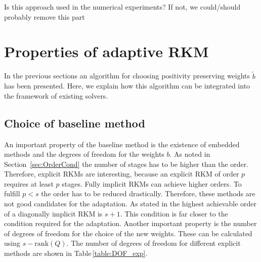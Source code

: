 \documentclass[a4paper]{article}
\numberwithin{equation}{section}
\theoremstyle{plain}
\theoremstyle{definition}
\numberwithin{theorem}{section}
\newcommand{\1}{\mathbbm{1}}
\newcommand{\todo}[1]{{\Large{\color{red}{#1}}}}
\begin{document}
\todo{TODO} Is this approach used in the numerical experiments?
If not, we could/should probably remove this part%

 
\section{Properties of adaptive RKM} \label{sec:integration}

In the previous sections an algorithm for choosing positivity preserving weights $\tilde{b}$ has been presented.
Here, we explain how this algorithm can be integrated into the framework of existing solvers.

\subsection{Choice of baseline method}
An important property of the baseline method is the existence of embedded methods and the degrees of freedom for the weights $b$.
As noted in Section~\ref{sec:OrderCond} the number of stages has to be higher than the order.
Therefore, explicit RKMs are interesting, because an explicit RKM of order $p$ requires at least $p$ stages.
Fully implicit RKMs can achieve higher orders.
To fulfill $p<s$ the order has to be reduced drastically. Therefore, these methods are not good candidates for the adaptation. 
As stated in \cite{norsett_attainable_1977} the highest achievable order of a diagonally implicit RKM is $s+1$. This condition is far closer to the condition required for the adaptation.
Another important property is the number of degrees of freedom for the choice of the new weights.  
These can be calculated using $s-\mathrm{rank}(Q)$. %
The number of degrees of freedom for different explicit methods are shown in Table\,\ref{table:DOF_exp}.
 
\end{document}
